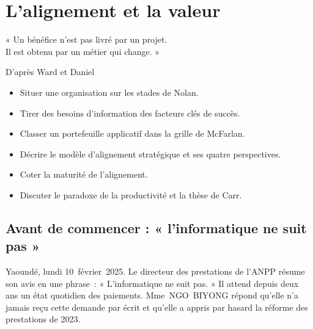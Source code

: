 
\chapter{L'alignement et la valeur}
\label{chap:alignement}

\epigraph{%
    « Un bénéfice n'est pas livré par un projet.\\
    Il est obtenu par un métier qui change. »%
}{D'après Ward et Daniel}


\begin{boxobjectifs}
\begin{itemize}
    \item Situer une organisation sur les stades de Nolan.
    \item Tirer des besoins d'information des facteurs clés de succès.
    \item Classer un portefeuille applicatif dans la grille de McFarlan.
    \item Décrire le modèle d'alignement stratégique et ses quatre perspectives.
    \item Coter la maturité de l'alignement.
    \item Discuter le paradoxe de la productivité et la thèse de Carr.
\end{itemize}
\end{boxobjectifs}

\bigskip

\section*{Avant de commencer : « l'informatique ne suit pas »}

Yaoundé, lundi 10~février~2025. Le directeur des prestations de l'ANPP résume son avis en une phrase~: « L'informatique
ne suit pas. » Il attend depuis deux ans un état quotidien des paiements. Mme~NGO~BIYONG répond qu'elle n'a
jamais reçu cette demande par écrit et qu'elle a appris par hasard la réforme des prestations de 2023.

